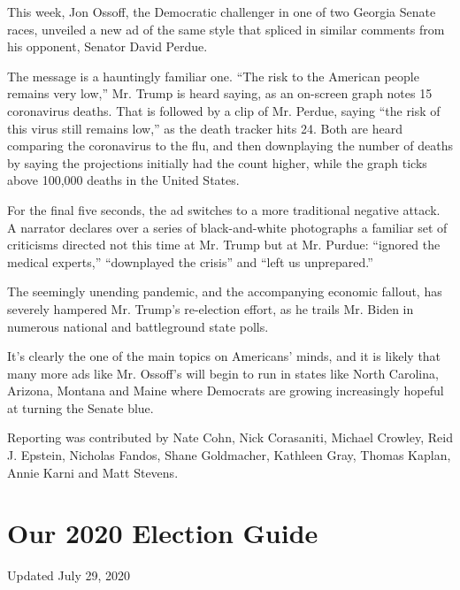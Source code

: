 This week, Jon Ossoff, the Democratic challenger in one of two Georgia
Senate races, unveiled a new ad of the same style that spliced in
similar comments from his opponent, Senator David Perdue.

The message is a hauntingly familiar one. ``The risk to the American
people remains very low,'' Mr. Trump is heard saying, as an on-screen
graph notes 15 coronavirus deaths. That is followed by a clip of Mr.
Perdue, saying ``the risk of this virus still remains low,'' as the
death tracker hits 24. Both are heard comparing the coronavirus to the
flu, and then downplaying the number of deaths by saying the projections
initially had the count higher, while the graph ticks above 100,000
deaths in the United States.

For the final five seconds, the ad switches to a more traditional
negative attack. A narrator declares over a series of black-and-white
photographs a familiar set of criticisms directed not this time at Mr.
Trump but at Mr. Purdue: ``ignored the medical experts,'' ``downplayed
the crisis'' and ``left us unprepared.''

The seemingly unending pandemic, and the accompanying economic fallout,
has severely hampered Mr. Trump's re-election effort, as he trails Mr.
Biden in numerous national and battleground state polls.

It's clearly the one of the main topics on Americans' minds, and it is
likely that many more ads like Mr. Ossoff's will begin to run in states
like North Carolina, Arizona, Montana and Maine where Democrats are
growing increasingly hopeful at turning the Senate blue.

Reporting was contributed by Nate Cohn, Nick Corasaniti, Michael
Crowley, Reid J. Epstein, Nicholas Fandos, Shane Goldmacher, Kathleen
Gray, Thomas Kaplan, Annie Karni and Matt Stevens.

\hypertarget{our-2020-election-guide}{%
\section{Our 2020 Election Guide}\label{our-2020-election-guide}}

Updated July 29, 2020

